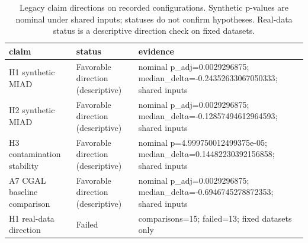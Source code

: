 \begin{table}
\caption{Legacy claim directions on recorded configurations. Synthetic p-values are nominal under shared inputs; statuses do not confirm hypotheses. Real-data status is a descriptive direction check on fixed datasets.}
\label{tab:claim_status}
\begin{tabular}{lll}
\toprule
claim & status & evidence \\
\midrule
H1 synthetic MIAD & Favorable direction (descriptive) & nominal p\_adj=0.0029296875; median\_delta=-0.24352633067050333; shared inputs \\
H2 synthetic MIAD & Favorable direction (descriptive) & nominal p\_adj=0.0029296875; median\_delta=-0.12857494612964593; shared inputs \\
H3 contamination stability & Favorable direction (descriptive) & nominal p=4.999750012499375e-05; median\_delta=0.14482230392156858; shared inputs \\
A7 CGAL baseline comparison & Favorable direction (descriptive) & nominal p\_adj=0.0029296875; median\_delta=-0.6946745278872353; shared inputs \\
H1 real-data direction & Failed & comparisons=15; failed=13; fixed datasets only \\
\bottomrule
\end{tabular}
\end{table}
